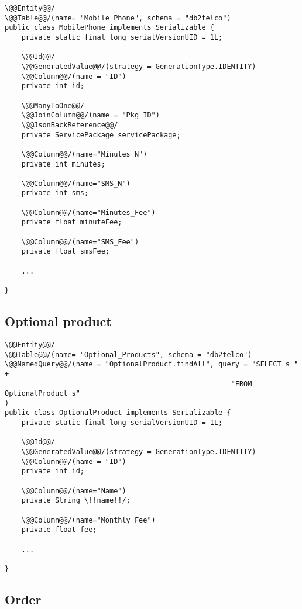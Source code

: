 \begin{lstlisting}[style = JPA]
\@@Entity@@/
\@@Table@@/(name= "Mobile_Phone", schema = "db2telco")
public class MobilePhone implements Serializable {
    private static final long serialVersionUID = 1L;

    \@@Id@@/
    \@@GeneratedValue@@/(strategy = GenerationType.IDENTITY)
    \@@Column@@/(name = "ID")
    private int id;

    \@@ManyToOne@@/
    \@@JoinColumn@@/(name = "Pkg_ID")
    \@@JsonBackReference@@/
    private ServicePackage servicePackage;

    \@@Column@@/(name="Minutes_N")
    private int minutes;

    \@@Column@@/(name="SMS_N")
    private int sms;

    \@@Column@@/(name="Minutes_Fee")
    private float minuteFee;

    \@@Column@@/(name="SMS_Fee")
    private float smsFee;
    
    ...

}
\end{lstlisting}

\subsection*{Optional product}

\begin{lstlisting}[style = JPA]
\@@Entity@@/
\@@Table@@/(name= "Optional_Products", schema = "db2telco")
\@@NamedQuery@@/(name = "OptionalProduct.findAll", query = "SELECT s " + 
                                                      "FROM OptionalProduct s"
)
public class OptionalProduct implements Serializable {
    private static final long serialVersionUID = 1L;

    \@@Id@@/
    \@@GeneratedValue@@/(strategy = GenerationType.IDENTITY)
    \@@Column@@/(name = "ID")
    private int id;

    \@@Column@@/(name="Name")
    private String \!!name!!/;

    \@@Column@@/(name="Monthly_Fee")
    private float fee;
    
    ...

}
\end{lstlisting}

\subsection*{Order}

